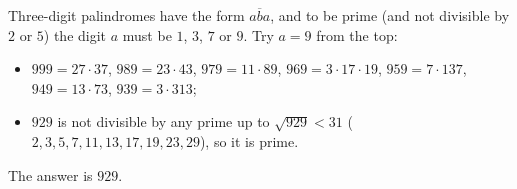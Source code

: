 Three-digit palindromes have the form $\overline{aba}$, and to be prime (and not divisible by $2$ or $5$) the digit $a$ must be $1$, $3$, $7$ or $9$. Try $a=9$ from the top:
\begin{itemize}
\item $999=27\cdot37$, $989=23\cdot43$, $979=11\cdot89$, $969=3\cdot17\cdot19$, $959=7\cdot137$, $949=13\cdot73$, $939=3\cdot313$;
\item $929$ is not divisible by any prime up to $\sqrt{929}<31$ ($2,3,5,7,11,13,17,19,23,29$), so it is prime.
\end{itemize}
The answer is $\boxed{929}$.
